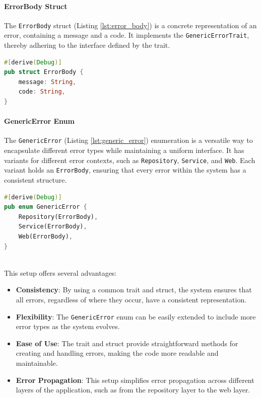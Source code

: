 \paragraph{ErrorBody Struct}
The \texttt{ErrorBody} struct (Listing \ref{lst:error_body}) is a concrete representation of an error, containing a message and a code. It implements the \texttt{GenericErrorTrait}, thereby adhering to the interface defined by the trait. 
\begin{lstlisting}[language=rust, caption={ErrorBody Utils Module}, label=lst:error_body]
#[derive(Debug)]
pub struct ErrorBody {
    message: String,
    code: String,
}
\end{lstlisting}

\paragraph{GenericError Enum}
The \texttt{GenericError} (Listing \ref{lst:generic_error}) enumeration is a versatile way to encapsulate different error types while maintaining a uniform interface. It has variants for different error contexts, such as \texttt{Repository}, \texttt{Service}, and \texttt{Web}. Each variant holds an \texttt{ErrorBody}, ensuring that every error within the system has a consistent structure.

\begin{lstlisting}[language=rust, caption={GenericError Utils Module}, label={lst:generic_error}]
#[derive(Debug)]
pub enum GenericError {
    Repository(ErrorBody),
    Service(ErrorBody),
    Web(ErrorBody),
}
\end{lstlisting}
\mbox{}\\
This setup offers several advantages:
\begin{itemize}
    \item \textbf{Consistency}: By using a common trait and struct, the system ensures that all errors, regardless of where they occur, have a consistent representation.
    \item \textbf{Flexibility}: The \texttt{GenericError} enum can be easily extended to include more error types as the system evolves.
    \item \textbf{Ease of Use}: The trait and struct provide straightforward methods for creating and handling errors, making the code more readable and maintainable.
    \item \textbf{Error Propagation}: This setup simplifies error propagation across different layers of the application, such as from the repository layer to the web layer.
\end{itemize}


